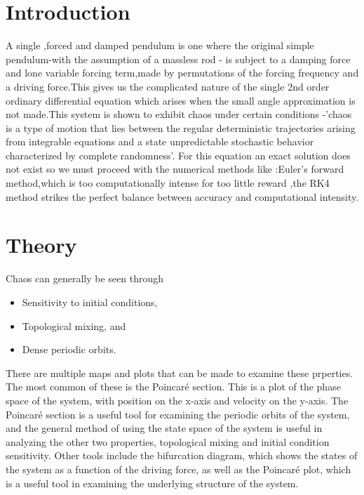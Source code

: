 \documentclass[11pt]{article} %
\begin{document}
\section{Introduction} 
\label{intro}

A single ,forced and damped pendulum is one where the original simple pendulum-with the assumption of a massless rod - is subject to a damping force and lone variable forcing term,made by permutations of the forcing frequency and a driving force.This gives  us the complicated nature of the single 2nd order ordinary differential equation which arises when the small angle approximation is not made.This system is shown to exhibit chaos under certain conditions -'chaos is a type of motion that lies between the regular deterministic trajectories arising from integrable equations and a state unpredictable stochastic behavior characterized by complete randomness'\cite{goldstein2002classical}. For this equation an exact solution does not exist so we must proceed with the numerical methods like :Euler's forward method,which is too computationally intense for too little reward ,the RK4 method strikes the perfect balance between accuracy and computational intensity.
\section{Theory}
    Chaos can generally be seen through
    \begin{itemize}
        \item Sensitivity to initial conditions,
        \item Topological mixing, and
        \item Dense periodic orbits.
    \end{itemize}
    There are multiple maps and plots that can be made to examine these prperties. 
    The most common of these is the Poincar\'e section. This is a plot of the phase 
    space of the system, with position on the x-axis and velocity 
    on the y-axis. The Poincar\'e section is a useful tool for examining the periodic 
    orbits of the system, and the general method of using the state space of the system 
    is useful in analyzing the other two properties, topological mixing and initial condition
    sensitivity. Other tools include the bifurcation diagram, which shows the states of the
    system as a function of the driving force, as well as the Poincar\'e plot, which is a useful
    tool in examining the underlying structure of the system. \cite{Strogatz2000}\\
\end{document}
